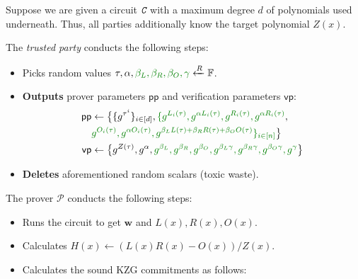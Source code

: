 \documentclass[../lecture-notes.tex]{subfiles}
\begin{document}
\begin{tcolorbox}[title=Attempt \#3: Sound SNARK Protocol,
    colback=blue!5!white,
    colframe=blue!75!black,
    colbacktitle=blue!25!white,
    coltitle=blue!20!black,
    fonttitle=\bfseries,
    boxrule=1.25pt,
    subtitle style={boxrule=0pt,
    colback=blue!20!white,
    colupper=blue!75!gray} ]

    Suppose we are given a circuit $\textit{\texttt{C}}$ with a maximum degree $d$ of polynomials used underneath. Thus, all parties additionally know the target polynomial $Z(x)$.

    The \emph{trusted party} conducts the following steps:
    \begin{itemize}[label=]
        \item Picks random values $\tau, \alpha, \textcolor{green!50!black}{\beta_L, \beta_R, \beta_O, \gamma} \xleftarrow{R} \mathbb{F}$.
        \item \textbf{Outputs} prover parameters $\mathsf{pp}$ and verification parameters $\mathsf{vp}$:
        \begin{align*}
            \mathsf{pp} &\gets \big\{\{g^{\tau^i}\}_{i \in [d]}, \textcolor{green!50!black}{\{g^{L_i(\tau)}, g^{\alpha L_i(\tau)}, g^{R_i(\tau)}, g^{\alpha R_i(\tau)}}, \\ 
            & \textcolor{green!50!black}{g^{O_i(\tau)}, g^{\alpha O_i(\tau)}, g^{\beta_LL(\tau)+\beta_RR(\tau)+\beta_OO(\tau)}\}_{i \in [n]}}\big\} \\
            \mathsf{vp} &\gets \big\{ g^{Z(\tau)}, g^{\alpha}, \textcolor{green!50!black}{g^{\beta_L}, g^{\beta_R}, g^{\beta_O}, g^{\beta_L\gamma}, g^{\beta_R\gamma}, g^{\beta_O\gamma}, g^{\gamma}} \big\}
        \end{align*}
        \item \textbf{Deletes} aforementioned random scalars (toxic waste).
    \end{itemize}
    The prover $\mathcal{P}$ conducts the following steps:
    \begin{itemize}[label=]
        \item Runs the circuit to get $\mathbf{w}$ and $L(x),R(x),O(x)$.
        \item Calculates $H(x) \gets (L(x)R(x) - O(x))\big/ Z(x)$.
        \item Calculates the sound KZG commitments as follows: 
        \begin{align*}

\end{align*}
\end{itemize}
\end{tcolorbox}
\end{document}
